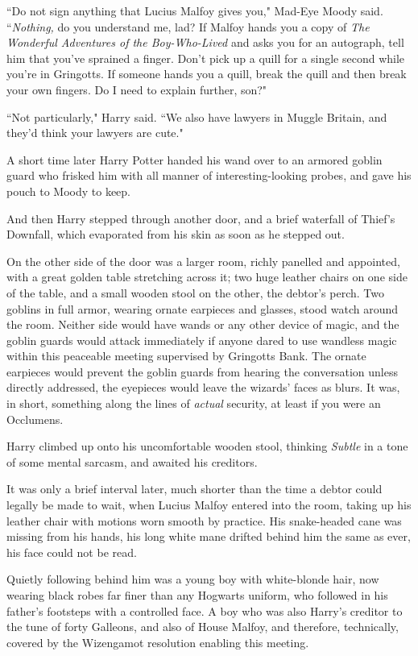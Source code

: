 ``Do not sign anything that Lucius Malfoy gives you," Mad-Eye Moody said. ``\emph{Nothing,} do you understand me, lad? If Malfoy hands you a copy of \emph{The Wonderful Adventures of the Boy-Who-Lived} and asks you for an autograph, tell him that you've sprained a finger. Don't pick up a quill for a single second while you're in Gringotts. If someone hands you a quill, break the quill and then break your own fingers. Do I need to explain further, son?"

``Not particularly," Harry said. ``We also have lawyers in Muggle Britain, and they'd think your lawyers are cute."

A short time later Harry Potter handed his wand over to an armored goblin guard who frisked him with all manner of interesting-looking probes, and gave his pouch to Moody to keep.

And then Harry stepped through another door, and a brief waterfall of Thief's Downfall, which evaporated from his skin as soon as he stepped out.

On the other side of the door was a larger room, richly panelled and appointed, with a great golden table stretching across it; two huge leather chairs on one side of the table, and a small wooden stool on the other, the debtor's perch. Two goblins in full armor, wearing ornate earpieces and glasses, stood watch around the room. Neither side would have wands or any other device of magic, and the goblin guards would attack immediately if anyone dared to use wandless magic within this peaceable meeting supervised by Gringotts Bank. The ornate earpieces would prevent the goblin guards from hearing the conversation unless directly addressed, the eyepieces would leave the wizards' faces as blurs. It was, in short, something along the lines of \emph{actual} security, at least if you were an Occlumens.

Harry climbed up onto his uncomfortable wooden stool, thinking \emph{Subtle} in a tone of some mental sarcasm, and awaited his creditors.

It was only a brief interval later, much shorter than the time a debtor could legally be made to wait, when Lucius Malfoy entered into the room, taking up his leather chair with motions worn smooth by practice. His snake-headed cane was missing from his hands, his long white mane drifted behind him the same as ever, his face could not be read.

Quietly following behind him was a young boy with white-blonde hair, now wearing black robes far finer than any Hogwarts uniform, who followed in his father's footsteps with a controlled face. A boy who was also Harry's creditor to the tune of forty Galleons, and also of House Malfoy, and therefore, technically, covered by the Wizengamot resolution enabling this meeting.

